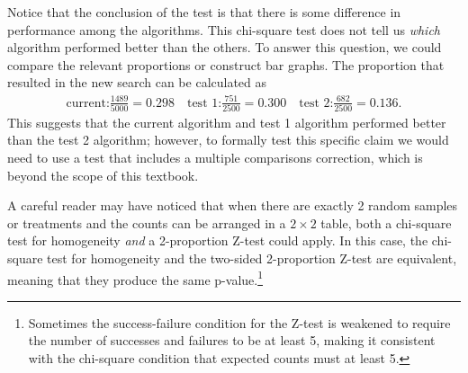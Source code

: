 Notice that the conclusion of the test is that there is some difference in performance among the algorithms.  This chi-square test does not tell us \emph{which} algorithm performed better than the others.  To answer this question, we could compare the relevant proportions or construct bar graphs.   The proportion that resulted in the new search can be calculated as 
\begin{align*}
\text{current:} \frac{1489}{5000} = 0.298 \quad \text{test 1:} \frac{751}{2500} = 0.300 \quad \text{test 2:} \frac{682}{2500} = 0.136.
\end{align*}
This suggests that the current algorithm and test 1 algorithm performed better than the test 2 algorithm; however, to formally test this specific claim we would need to use a test that includes a multiple comparisons correction, which is beyond the scope of this textbook.



A careful reader may have noticed that when there are exactly 2 random samples or treatments and the counts can be arranged in a $2\times 2$ table, both a chi-square test for homogeneity \emph{and} a 2-proportion Z-test could apply.   In this case, the chi-square test for homogeneity and the two-sided 2-proportion Z-test are equivalent, meaning that they produce the same p-value.\footnote{Sometimes the success-failure condition for the Z-test is weakened to require the number of successes and failures to be at least 5, making it consistent with the chi-square condition that expected counts must at least 5.}



